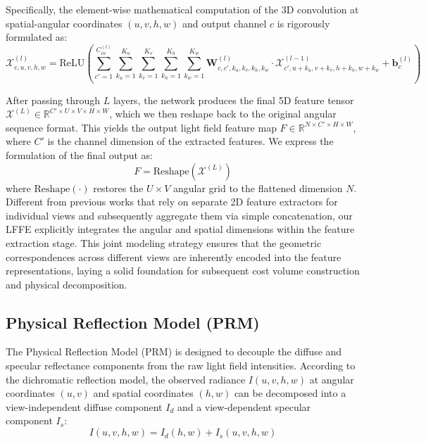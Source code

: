 Specifically, the element-wise mathematical computation of the 3D convolution at spatial-angular coordinates $(u, v, h, w)$ and output channel $c$ is rigorously formulated as:
\begin{equation}
\label{eq:eq21}
\mathcal{X}^{(l)}_{c, u, v, h, w} = \text{ReLU} \left( \sum_{c'=1}^{C_{in}^{(l)}} \sum_{k_u=1}^{K_u} \sum_{k_v=1}^{K_v} \sum_{k_h=1}^{K_h} \sum_{k_w=1}^{K_w} \mathbf{W}^{(l)}_{c, c', k_u, k_v, k_h, k_w} \cdot \mathcal{X}^{(l-1)}_{c', u+k_u, v+k_v, h+k_h, w+k_w} + \mathbf{b}^{(l)}_c \right)
\end{equation}

After passing through $L$ layers, the network produces the final 5D feature tensor $\mathcal{X}^{(L)} \in \mathbb{R}^{C' \times U \times V \times H \times W}$, which we then reshape back to the original angular sequence format. This yields the output light field feature map $F \in \mathbb{R}^{N \times C' \times H \times W}$, where $C'$ is the channel dimension of the extracted features. We express the formulation of the final output as:
\begin{equation}
\label{eq:eq22}
F = \text{Reshape}\left( \mathcal{X}^{(L)} \right)
\end{equation}
where $\text{Reshape}(\cdot)$ restores the $U \times V$ angular grid to the flattened dimension $N$. Different from previous works that rely on separate 2D feature extractors for individual views and subsequently aggregate them via simple concatenation, our LFFE explicitly integrates the angular and spatial dimensions within the feature extraction stage. This joint modeling strategy ensures that the geometric correspondences across different views are inherently encoded into the feature representations, laying a solid foundation for subsequent cost volume construction and physical decomposition.

\subsection{Physical Reflection Model (PRM)}

The Physical Reflection Model (PRM) is designed to decouple the diffuse and specular reflectance components from the raw light field intensities. According to the dichromatic reflection model, the observed radiance $I(u,v,h,w)$ at angular coordinates $(u,v)$ and spatial coordinates $(h,w)$ can be decomposed into a view-independent diffuse component $I_d$ and a view-dependent specular component $I_s$:
\begin{equation}
\label{eq:eq23}
I(u,v,h,w) = I_d(h,w) + I_s(u,v,h,w)
\end{equation}

